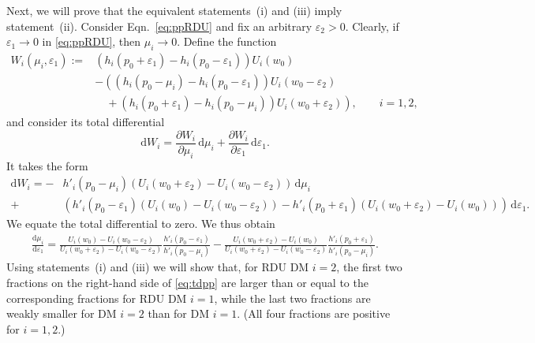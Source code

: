 \documentclass[11pt]{article}
\begin{document}
\begin{appendices}
Next, we will prove that the equivalent statements~(i) and (iii) imply statement~(ii).
Consider Eqn.~\eqref{eq:ppRDU} and fix an arbitrary $\varepsilon_{2}>0$.
Clearly, if $\varepsilon_{1}\rightarrow 0$ in \eqref{eq:ppRDU},
then $\mu_{i}\rightarrow 0$.
Define the function
\begin{align*}
W_{i}(\mu_{i},\varepsilon_{1})
:=&\left(h_{i}(p_{0}+\varepsilon_{1})-h_{i}(p_{0}-\varepsilon_{1})\right)U_{i}(w_{0})\nonumber\\
&-\left(\left(h_{i}(p_{0}-\mu_{i})-h_{i}(p_{0}-\varepsilon_{1})\right)U_{i}(w_{0}-\varepsilon_{2})\nonumber\right.\\
&\left.\quad+\left(h_{i}(p_{0}+\varepsilon_{1})-h_{i}(p_{0}-\mu_{i})\right)U_{i}(w_{0}+\varepsilon_{2})\right),\qquad i=1,2,
\end{align*}
and consider its total differential
\begin{equation*}
\mathrm{d}W_{i}=\frac{\partial W_{i}}{\partial \mu_{i}}\,\mathrm{d}\mu_{i} + \frac{\partial W_{i}}{\partial \varepsilon_{1}}\,\mathrm{d}\varepsilon_{1}.
\end{equation*}
It takes the form
\begin{align*}
\mathrm{d}W_{i}=-&h'_{i}(p_{0}-\mu_{i})\left(U_{i}(w_{0}+\varepsilon_{2})-U_{i}(w_{0}-\varepsilon_{2})\right)\,\mathrm{d}\mu_{i}\\
+&\left(h'_{i}(p_{0}-\varepsilon_{1})\left(U_{i}(w_{0})-U_{i}(w_{0}-\varepsilon_{2})\right)
-h'_{i}(p_{0}+\varepsilon_{1})\left(U_{i}(w_{0}+\varepsilon_{2})-U_{i}(w_{0})\right)\right)\,\mathrm{d}\varepsilon_{1}.
\end{align*}
We equate the total differential to zero.
We thus obtain
\begin{align}
\frac{\mathrm{d}\mu_{i}}{\mathrm{d}\varepsilon_{1}}=
\frac{U_{i}(w_{0})-U_{i}(w_{0}-\varepsilon_{2})}{U_{i}(w_{0}+\varepsilon_{2})-U_{i}(w_{0}-\varepsilon_{2})}\frac{h'_{i}(p_{0}-\varepsilon_{1})}{h'_{i}(p_{0}-\mu_{i})}
-\frac{U_{i}(w_{0}+\varepsilon_{2})-U_{i}(w_{0})}{U_{i}(w_{0}+\varepsilon_{2})-U_{i}(w_{0}-\varepsilon_{2})}\frac{h'_{i}(p_{0}+\varepsilon_{1})}{h'_{i}(p_{0}-\mu_{i})}.
\label{eq:tdpp}
\end{align}
Using statements~(i) and (iii) we will show that, for RDU DM $i=2$,
the first two fractions on the right-hand side of \eqref{eq:tdpp}
are larger than or equal to the corresponding fractions
for RDU DM $i=1$,
while the last two fractions are weakly smaller for DM $i=2$ than for DM $i=1$.
(All four fractions are positive for $i=1,2$.)


\end{appendices}
\end{document}

